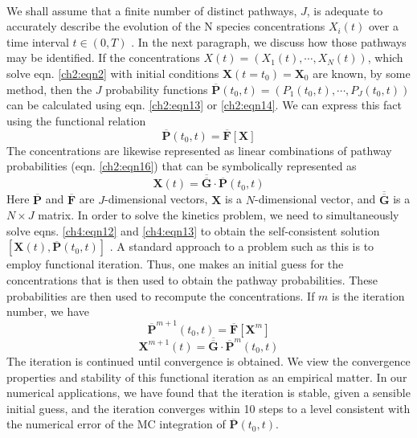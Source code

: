 \paragraph{}
We shall assume that a finite number of distinct pathways, $J$,
is adequate to accurately describe the evolution of the N species
concentrations $X_i(t)$ over a time interval $t \in (0, T)$ . In the next
paragraph, we discuss how those pathways may be identified. If
the concentrations $X(t) = \left(X_1(t),\cdots,X_N(t)\right)$, which solve eqn. \ref{ch2:eqn2}
with initial conditions $\mathbf{X}(t = t_0) = {\textbf{X}}_0$ are known, by some
method, then the $J$ probability functions $\overline{\mathbf{P}}(t_0,t) = \left(P_1(t_0, t), \cdots,
P_J(t_0, t)\right)$ can be calculated using eqn. \ref{ch2:eqn13} or \ref{ch2:eqn14}. We can express this
fact using the functional relation
\begin{equation}
\label{ch4:eqn12}
\overline{\mathbf{P}}(t_0,t) = \overline{\mathbf{F}} \left[ \mathbf{X} \right]
\end{equation}
The concentrations are likewise represented as linear
combinations of pathway probabilities (eqn. \ref{ch2:eqn16}) that can be
symbolically represented as
\begin{equation}
\label{ch4:eqn13}
\mathbf{X}(t) = \overline{\overline{\mathbf{G}}} \cdot \overline{\mathbf{P}}(t_0,t)
\end{equation}
Here $ \overline{\mathbf{P}}$ and $ \overline{\mathbf{F}}$ are $J$-dimensional vectors, $\mathbf{X}$ is a $N$-dimensional
vector, and $\overline{\overline{\mathbf{G}}}$ is a $N \times J$ matrix. In order to solve the kinetics
problem, we need to simultaneously solve eqns. \ref{ch4:eqn12} and \ref{ch4:eqn13} to
obtain the self-consistent solution $\left[ \mathbf{X}(t), \overline{\mathbf{P}}(t_0,t) \right]$ . A standard
approach to a problem such as this is to employ functional
iteration.\cite{ch4_27_roussel1990geometry} Thus, one makes an initial guess for the
concentrations that is then used to obtain the pathway
probabilities. These probabilities are then used to recompute
the concentrations. If $m$ is the iteration number, we have
\begin{equation}
\label{ch4:eqn14}
{\overline{\mathbf{P}}}^{m+1}(t_0,t) = \overline{\mathbf{F}} \left[ {\mathbf{X}}^{m} \right]
\end{equation}
\begin{equation}
\label{ch4:eqn15}
{\mathbf{X}}^{m+1}(t) = \overline{\overline{\mathbf{G}}} \cdot {\overline{\mathbf{P}}}^{m}(t_0,t)
\end{equation}
The iteration is continued until convergence is obtained. We
view the convergence properties and stability of this functional
iteration as an empirical matter. In our numerical applications,
we have found that the iteration is stable, given a sensible initial
guess, and the iteration converges within 10 steps to a level
consistent with the numerical error of the MC integration of $\overline{\mathbf{P}}(t_0,t)$.
